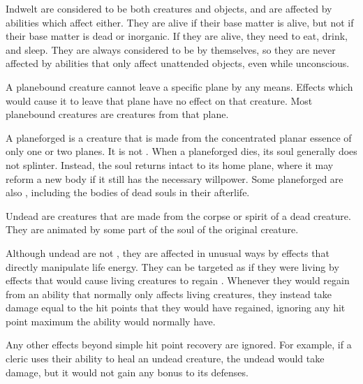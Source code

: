   Indwelt are considered to be both creatures and objects, and are affected by abilities which affect either.
  They are alive if their base matter is alive, but not if their base matter is dead or inorganic.
  If they are alive, they need to eat, drink, and sleep.
  They are always considered to be  by themselves, so they are never affected by abilities that only affect unattended objects, even while unconscious.

  A planebound creature cannot leave a specific plane by any means.
  Effects which would cause it to leave that plane have no effect on that creature.
  Most planebound creatures are  creatures from that plane.

  A planeforged is a creature that is made from the concentrated planar essence of only one or two planes.
  It is not .
  When a planeforged dies, its soul generally does not splinter.
  Instead, the soul returns intact to its home plane, where it may reform a new body if it still has the necessary willpower.
  Some planeforged are also , including the bodies of dead souls in their afterlife.

  Undead are creatures that are made from the corpse or spirit of a dead creature.
  They are animated by some part of the soul of the original creature.

  Although undead are not , they are affected in unusual ways by effects that directly manipulate life energy.
  They can be targeted as if they were living  by \magical effects that would cause living creatures to regain .
  Whenever they would regain  from an ability that normally only affects living creatures, they instead take damage equal to the hit points that they would have regained, ignoring any hit point maximum the ability would normally have.

  Any other effects beyond simple hit point recovery are ignored.
  For example, if a cleric uses their  ability to heal an undead creature, the undead would take damage, but it would not gain any bonus to its defenses.

